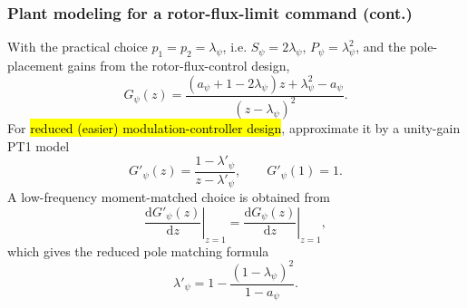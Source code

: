 \begin{frame}
    \frametitle{Plant modeling for a rotor-flux-limit command (cont.)}
    With the practical choice \(p_1=p_2=\lambda_\psi\), i.e.
    \(S_\psi=2\lambda_\psi\), \(P_\psi=\lambda_\psi^2\), and the pole-placement gains from the rotor-flux-control design,
    \[
        G_{\psi}(z)
        =
        \frac{
            (a_\psi+1-2\lambda_\psi)z+\lambda_\psi^2-a_\psi
        }{
            (z-\lambda_\psi)^2
        } .
    \]\pause%
    For \hl{reduced (easier) modulation-controller design}, approximate it by a unity-gain PT1 model
    \begin{equation}
        G'_{\psi}(z)
        =
        \frac{1-\lambda'_{\psi}}{z-\lambda'_{\psi}},
        \qquad
        G'_{\psi}(1)=1 .
    \end{equation}\pause%
    A low-frequency moment-matched choice is obtained from
    \begin{equation}
        \left.
        \frac{\mathrm d G'_{\psi}(z)}{\mathrm d z}
        \right|_{z=1}
        =
        \left.
        \frac{\mathrm d G_{\psi}(z)}{\mathrm d z}
        \right|_{z=1},
    \end{equation}\pause%
    which gives the reduced pole matching formula
    \begin{equation}
        \lambda'_{\psi}
        =
        1-
        \frac{(1-\lambda_\psi)^2}{1-a_\psi}.
    \end{equation}
\end{frame}

